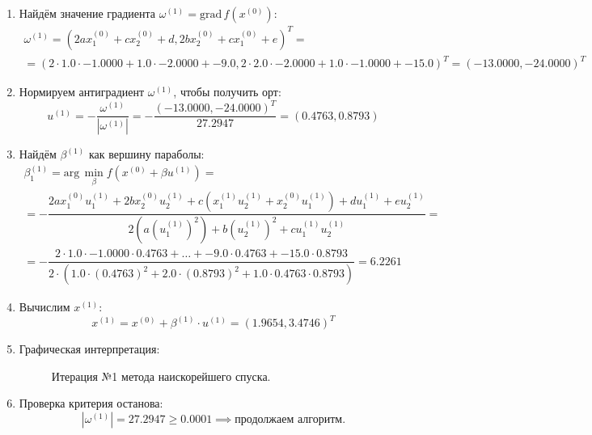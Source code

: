 \documentclass[12pt]{article}
\begin{document}
\begin{enumerate}
  \item Найдём значение градиента $\omega^{(1)}=\textrm{grad}\,f(x^{(0)})$:
  \[
  \begin{gathered}
    \omega^{(1)}=(2ax_1^{(0)}+cx_2^{(0)}+d,2bx_2^{(0)}+cx_1^{(0)}+e)^T=\\
    =(2\cdot 1.0\cdot -1.0000+1.0\cdot -2.0000+-9.0, 2\cdot 2.0\cdot -2.0000+1.0\cdot -1.0000+-15.0)^T=(-13.0000, -24.0000)^T
  \end{gathered}
  \]

  \item Нормируем антиградиент \( \omega^{(1)} \), чтобы получить орт:
  \[
    u^{(1)}=-\dfrac{\omega^{(1)}}{|\omega^{(1)}|}=-\dfrac{(-13.0000, -24.0000)^T}{27.2947}=(0.4763,0.8793)
  \]

  \item Найдём \( \beta^{(1)} \) как вершину параболы:
  \[
  \begin{gathered}
    \beta^{(1)}_1=\textrm{arg}\,\min_{\beta}f(x^{(0)}+\beta u^{(1)})=\\
    =-\dfrac{2ax^{(0)}_1u_1^{(1)}+2bx_2^{(0)}u_2^{(1)}+c(x_1^{(1)}u_2^{(1)}+x^{(0)}_2u_1^{(1)})+du_1^{(1)}+eu_2^{(1)}}{2(a(u_1^{(1)})^2)+b(u_2^{(1)})^2+cu_1^{(1)}u_2^{(1)}}=\\
    =-\dfrac{2\cdot 1.0\cdot -1.0000\cdot 0.4763+\dots+-9.0\cdot 0.4763+-15.0\cdot 0.8793}{2\cdot (1.0\cdot(0.4763)^2+2.0\cdot (0.8793)^2+1.0\cdot 0.4763\cdot 0.8793)}=6.2261
  \end{gathered}
  \]

  \item Вычислим \( x^{(1)} \):
  \[
    x^{(1)}=x^{(0)}+\beta^{(1)}\cdot u^{(1)}=(1.9654,3.4746)^T
  \]

  \item Графическая интерпретация:
  \begin{figure}[H]
  \centering
  \caption{Итерация №1 метода наискорейшего спуска.}
  \end{figure}

  \item Проверка критерия останова:
  \[
    |\omega^{(1)}|=27.2947\geq 0.0001\implies\text{продолжаем алгоритм.}
  \]
\end{enumerate}
\end{document}
